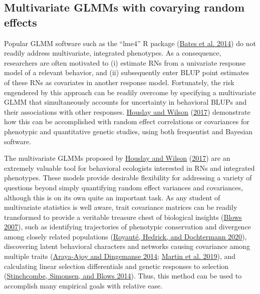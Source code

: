 \documentclass{article}
\begin{document}
\hypertarget{multivariate-glmms-with-covarying-random-effects}{%
\subsection{Multivariate GLMMs with covarying random
effects}\label{multivariate-glmms-with-covarying-random-effects}}

Popular GLMM software such as the ``lme4'' R package
(\protect\hyperlink{ref-Bates2014}{Bates et al. 2014}) do not readily
address multivariate, integrated phenotypes. As a consequence,
researchers are often motivated to (i) estimate RNs from a univariate
response model of a relevant behavior, and (ii) subsequently enter BLUP
point estimates of these RNs as covariates in another response model.
Fortunately, the risk engendered by this approach can be readily
overcome by specifying a multivariate GLMM that simultaneously accounts
for uncertainty in behavioral BLUPs and their associations with other
responses. \protect\hyperlink{ref-Hous2017}{Houslay and Wilson}
(\protect\hyperlink{ref-Hous2017}{2017}) demonstrate how this can be
accomplished with random effect correlations or covariances for
phenotypic and quantitative genetic studies, using both frequentist and
Bayesian software.

The multivariate GLMMs proposed by
\protect\hyperlink{ref-Hous2017}{Houslay and Wilson}
(\protect\hyperlink{ref-Hous2017}{2017}) are an extremely valuable tool
for behavioral ecologists interested in RNs and integrated phenotypes.
These models provide desirable flexibility for addressing a variety of
questions beyond simply quantifying random effect variances and
covariances, although this is on its own quite an important task. As any
student of multivariate statistics is well aware, trait covariance
matrices can be readily transformed to provide a veritable treasure
chest of biological insights (\protect\hyperlink{ref-Blows2007}{Blows
2007}), such as identifying trajectories of phenotypic conservation and
divergence among closely related populations
(\protect\hyperlink{ref-Roy2020}{Royauté, Hedrick, and Dochtermann
2020}), discovering latent behavioral characters and networks causing
covariance among multiple traits
(\protect\hyperlink{ref-Araya2014}{Araya-Ajoy and Dingemanse 2014};
\protect\hyperlink{ref-Martin2019}{Martin et al. 2019}), and calculating
linear selection differentials and genetic responses to selection
(\protect\hyperlink{ref-Stinch2014}{Stinchcombe, Simonsen, and Blows
2014}). Thus, this method can be used to accomplish many empirical goals
with relative ease.
\end{document}
